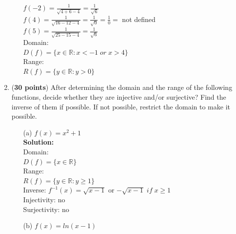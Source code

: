 \documentclass[a4paper]{article}
\begin{document}
\begin{enumerate}
\begin{itemize}
$f(-2) = \frac{1}{\sqrt{4 + 6 - 4}} = \frac{1}{\sqrt{6}}$\\

$f(4) = \frac{1}{\sqrt{16 - 12 - 4}} = \frac{1}{\sqrt{0}} = \frac{1}{0} = $ not defined\\

$f(5) = \frac{1}{\sqrt{25 - 15 - 4}} = \frac{1}{\sqrt{6}}$\\

Domain:\\

$D(f) = \{ x \in \mathbb{R}: x < -1 \; or \; x > 4 \}$\\
  
Range:\\

$R(f) = \{ y \in \mathbb{R}: y > 0\}$\\


\end{itemize}







\item (\textbf{30 points}) After determining the domain and the range of the following functions, decide whether they are injective and/or surjective? Find the inverse of them if possible. If not possible, restrict the domain to make it possible.


\begin{itemize}


	\item[(a)] $f(x) = x^2 + 1$\\

	\textbf{Solution:}\\

Domain:\\

$D(f) = \{ x \in \mathbb{R} \}$\\

Range:\\

$R(f) = \{ y \in \mathbb{R}: y \geq 1\}$\\

Inverse: $f^{-1}(x) = \sqrt{x - 1}$ or $- \sqrt{x - 1} \; if \; x \geq 1$ \\

Injectivity: no\\
Surjectivity: no\\



	\item[(b)] $f(x) = ln(x - 1)$\\
	

\end{itemize}
\end{enumerate}
\end{document}
